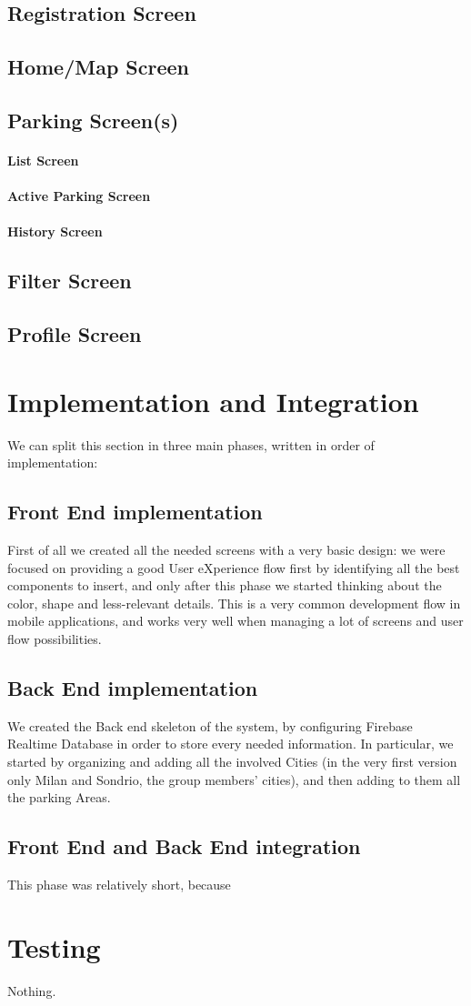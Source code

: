 \documentclass[11pt]{article} %
\begin{document}
\subsection{Registration Screen}
\subsection{Home/Map Screen}
\subsection{Parking Screen(s)}
\paragraph{List Screen}
\paragraph{Active Parking Screen}
\paragraph{History Screen}
\subsection{Filter Screen}
\subsection{Profile Screen}

\section{Implementation and Integration}
We can split this section in three main phases, written in order of implementation: 

\subsection{Front End implementation}
First of all we created all the needed screens with a very basic design: we were focused on providing a good User eXperience flow first by identifying all the best components to insert, and only after this phase we started thinking about the color, shape and less-relevant details. This is a very common development flow in mobile applications, and works very well when managing a lot of screens and user flow possibilities.   
\subsection{Back End implementation}
We created the Back end skeleton of the system, by configuring Firebase Realtime Database in order to store every needed information. In particular, we started by organizing and adding all the involved Cities (in the very first version only Milan and Sondrio, the group members' cities), and then adding to them all the parking Areas. 
\subsection{Front End and Back End integration}
This phase was relatively short, because 

\section{Testing}
Nothing.
\end{document}
